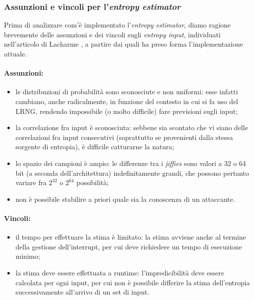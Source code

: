 \documentclass{article}
\begin{document}
\subsubsection{Assunzioni e vincoli per l'\emph{entropy
estimator}}\label{vincoliStima} 
Prima di analizzare com'è implementato
l'\emph{entropy estimator}, diamo ragione brevemente delle assunzioni e dei
vincoli sugli \emph{entropy input}, individuati nell'articolo di Lacharme
\cite{lach}, a partire dai quali ha preso forma l'implementazione attuale.
\paragraph{Assunzioni:}
\begin{itemize}
  \item le distribuzioni di probabilità sono sconosciute e non uniformi: esse
  infatti cambiano, anche radicalmente, in funzione del contesto in cui si fa
  uso del LRNG, rendendo impossibile (o molto difficile) fare previsioni sugli
  input;
  \item la correlazione fra input è sconosciuta: sebbene sia scontato che vi
  siano delle correlazioni fra input consecutivi (soprattutto se provenienti
  dalla stessa sorgente di entropia), è difficile catturarne la natura;
  \item lo spazio dei campioni è ampio: le differenze tra i \emph{jiffies} sono
  valori a 32 o 64 bit (a seconda dell'architettura) indefinitamente grandi, che
  possono pertanto variare fra $2^{32}$ o $2^{64}$ possibilità;
  \item non è possibile stabilire a priori quale sia la conoscenza di un
  attaccante.
\end{itemize}
\paragraph{Vincoli:}
\begin{itemize}
  \item il tempo per effettuare la stima è limitato: la stima avviene anche al
  termine della gestione dell'interrupt, per cui deve richiedere un tempo di
  esecuzione minimo;
  \item la stima deve essere effettuata a runtime: l'impredicibilità deve essere
  calcolata per ogni input, per cui non è possibile differire la stima
  dell'entropia successivamente all'arrivo di un set di input.
\end{itemize}
 
\end{document}
